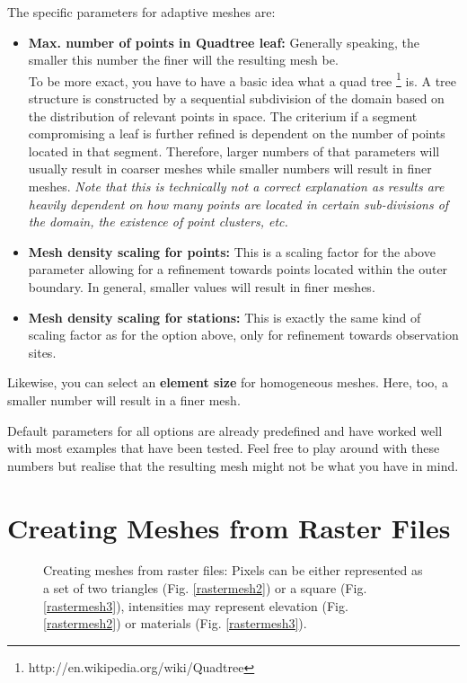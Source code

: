 The specific parameters for adaptive meshes are:
\begin{itemize}
\item \textbf{Max. number of points in Quadtree leaf:} Generally speaking, the smaller this number the finer will the resulting mesh be. \\
    To be more exact, you have to have a basic idea what a quad tree \footnote{http://en.wikipedia.org/wiki/Quadtree} is. A tree structure is constructed by a sequential subdivision of the domain based on the distribution of relevant points in space. The criterium if a segment compromising a leaf is further refined is dependent on the number of points located in that segment. Therefore, larger numbers of that parameters will usually result in coarser meshes while smaller numbers will result in finer meshes. \emph{Note that this is technically not a correct explanation as results are heavily dependent on how many points are located in certain sub-divisions of the domain, the existence of point clusters, etc.}
\item \textbf{Mesh density scaling for points:} This is a scaling factor for the above parameter allowing for a refinement towards points located within the outer boundary. In general, smaller values will result in finer meshes.
\item \textbf{Mesh density scaling for stations:} This is exactly the same kind of scaling factor as for the option above, only for refinement towards observation sites.
\end{itemize}

Likewise, you can select an \textbf{element size} for homogeneous meshes. Here, too, a smaller number will result in a finer mesh.

\bigskip

Default parameters for all options are already predefined and have worked well with most examples that have been tested. Feel free to play around with these numbers but realise that the resulting mesh might not be what you have in mind.

\section{Creating Meshes from Raster Files}
\label{meshraster}

\begin{figure}[tb]
\begin{center}
\enspace
{}\enspace
{}
\end{center}
\caption{Creating meshes from raster files: Pixels can be either represented as a set of two triangles (Fig. \ref{rastermesh2}) or a square (Fig. \ref{rastermesh3}), intensities may represent elevation (Fig. \ref{rastermesh2}) or materials (Fig. \ref{rastermesh3}).}
\label{fig:rastermesh}
\end{figure}

